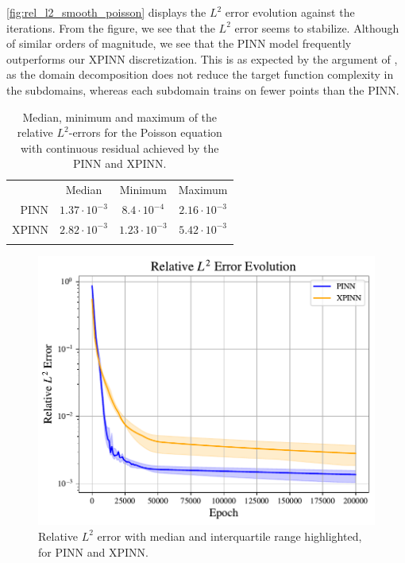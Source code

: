 
\autoref{fig:rel_l2_smooth_poisson} displays the $L^2$ error evolution against the iterations.
From the figure, we see that the $L^2$ error seems to stabilize.
Although of similar orders of magnitude, we see that the PINN model frequently outperforms our XPINN discretization.
This is as expected by the argument of \textcite{XPINN_generalize}, as the domain decomposition does not reduce the target function complexity in the subdomains, whereas each subdomain trains on fewer points than the PINN. 

\begin{table}[h]
\caption{Median, minimum and maximum of the relative $L^2$-errors for the Poisson equation with continuous residual achieved by the PINN and XPINN.}
    \centering
    \begin{tabular}{r|c|c|c}\toprule
     & Median & Minimum & Maximum
    \\
    \colrule
    PINN & $1.37\cdot 10^{-3}$ &  $8.4 \cdot 10^{-4}$ & $2.16 \cdot 10^{-3}$ 
    \\
    XPINN & $2.82\cdot 10^{-3} $ &  $1.23 \cdot 10^{-3}$ & $5.42 \cdot 10^{-3}$
    \\
    \botrule
    \end{tabular}
    \label{table:cont_poisson}
\end{table}
\begin{figure}[h!]
    \centering
    \includegraphics[width = 0.8\linewidth]{Project1XPINNs/figures/Poisson/smooth_l2_error_evolution.pdf}
    \caption{Relative $L^2$ error with median and interquartile range highlighted, for PINN and XPINN.}
    \label{fig:rel_l2_smooth_poisson}
\end{figure}

